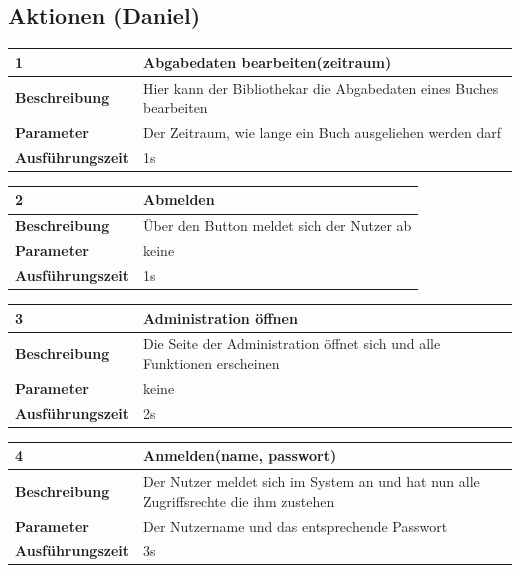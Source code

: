\documentclass[fontsize=12pt,paper=a4,twoside]{scrartcl}
\begin{document}
\subsection{Aktionen (Daniel)} \label{subsec:Aktionen} 
\begin{table}
	[H] \label{a1} 
	\begin{tabular}
		{|l|p{10cm}|} \hline \textbf{1} & \textbf{Abgabedaten bearbeiten(zeitraum)} \\
		\hline \textbf{Beschreibung} & Hier kann der Bibliothekar die Abgabedaten eines Buches bearbeiten\\
		\hline \textbf{Parameter} & Der Zeitraum, wie lange ein Buch ausgeliehen werden darf\\
		\hline \textbf{Ausführungszeit} & 1s\\
		\hline 
	\end{tabular}
\end{table}
\begin{table}
	[H] \label{a2} 
	\begin{tabular}
		{|l|p{10cm}|} \hline \textbf{2} & \textbf{Abmelden} \\
		\hline \textbf{Beschreibung} & Über den Button meldet sich der Nutzer ab\\
		\hline \textbf{Parameter} & keine \\
		\hline \textbf{Ausführungszeit} & 1s\\
		\hline 
	\end{tabular}
\end{table}
\begin{table}
	[H] \label{a3} 
	\begin{tabular}
		{|l|p{10cm}|} \hline \textbf{3} & \textbf{Administration öffnen} \\
		\hline \textbf{Beschreibung} & Die Seite der Administration öffnet sich und alle Funktionen erscheinen\\
		\hline \textbf{Parameter} & keine \\
		\hline \textbf{Ausführungszeit} & 2s\\
		\hline 
	\end{tabular}
\end{table}
\begin{table}
	[H] \label{a4} 
	\begin{tabular}
		{|l|p{10cm}|} \hline \textbf{4} & \textbf{Anmelden(name, passwort)} \\
		\hline \textbf{Beschreibung} & Der Nutzer meldet sich im System an und hat nun alle Zugriffsrechte die ihm zustehen\\
		\hline \textbf{Parameter} & Der Nutzername und das entsprechende Passwort \\
		\hline \textbf{Ausführungszeit} & 3s\\
		\hline 
	\end{tabular}
\end{table}
\end{document}
